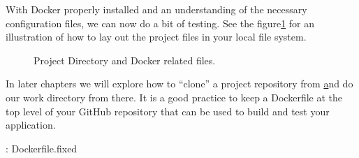 \justify{}
With Docker properly installed and an understanding of the necessary configuration files, we can now do a bit of testing.
See the figure\ref{dockerdirectory} for an illustration of how to lay out the project files in your local file system.

\begin{figure}[!htb]
  \centering
  
  \caption{Project Directory and Docker related files.}
\label{dockerdirectory}
\end{figure}


\justify{}
In later chapters we will explore how to ``clone'' a project repository from \href{github.com} and do our work directory
from there. It is a good practice to keep a Dockerfile at the top level of your GitHub repository that can be used to
build and test your application.


\justify{}
\begin{mybox}{\thetcbcounter: Dockerfile.fixed}
    
    \label{fixeddockerfile}
\end{mybox}






